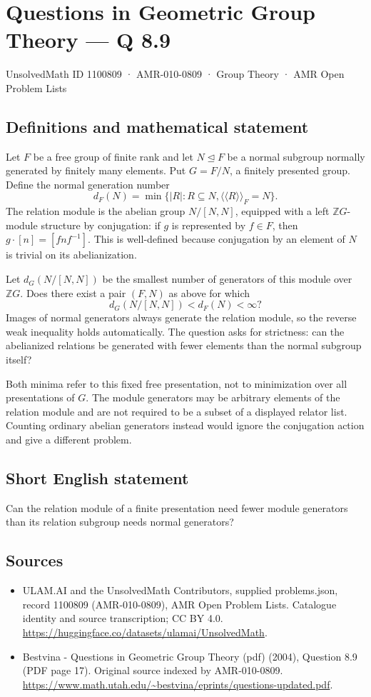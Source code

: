 \documentclass[11pt,a4paper]{article}
\begin{document}
\section*{Questions in Geometric Group Theory — Q 8.9}\label{1100809}
{\small UnsolvedMath ID 1100809 · AMR-010-0809 · Group Theory · AMR Open Problem Lists}
\subsection{Definitions and mathematical statement}
Let $F$ be a free group of finite rank and let $N\trianglelefteq F$ be a normal subgroup normally generated by finitely many elements. Put $G=F/N$, a finitely presented group. Define the normal generation number
\[
 d_F(N)=\min\{|R|:R\subseteq N,
                    \langle\!\langle R\rangle\!\rangle_F=N\}.
\]
The relation module is the abelian group $N/[N,N]$, equipped with a left $\mathbb ZG$-module structure by conjugation: if $g$ is represented by $f\in F$, then $g\cdot[n]=[fnf^{-1}]$. This is well-defined because conjugation by an element of $N$ is trivial on its abelianization.

Let $d_G(N/[N,N])$ be the smallest number of generators of this module over $\mathbb ZG$. Does there exist a pair $(F,N)$ as above for which
\[
 d_G(N/[N,N])<d_F(N)<\infty?
\]
Images of normal generators always generate the relation module, so the reverse weak inequality holds automatically. The question asks for strictness: can the abelianized relations be generated with fewer elements than the normal subgroup itself?

Both minima refer to this fixed free presentation, not to minimization over all presentations of $G$. The module generators may be arbitrary elements of the relation module and are not required to be a subset of a displayed relator list. Counting ordinary abelian generators instead would ignore the conjugation action and give a different problem.
\subsection{Short English statement}
Can the relation module of a finite presentation need fewer module generators than its relation subgroup needs normal generators?
\subsection{Sources}
\begin{itemize}
\item[S1] ULAM.AI and the UnsolvedMath Contributors, supplied problems.json, record 1100809 (AMR-010-0809), AMR Open Problem Lists. Catalogue identity and source transcription; CC BY 4.0.
\url{https://huggingface.co/datasets/ulamai/UnsolvedMath}.
\item[S2] Bestvina - Questions in Geometric Group Theory (pdf) (2004), Question 8.9 (PDF page 17). Original source indexed by AMR-010-0809.
\url{https://www.math.utah.edu/~bestvina/eprints/questions-updated.pdf}.
\end{itemize}
\end{document}
